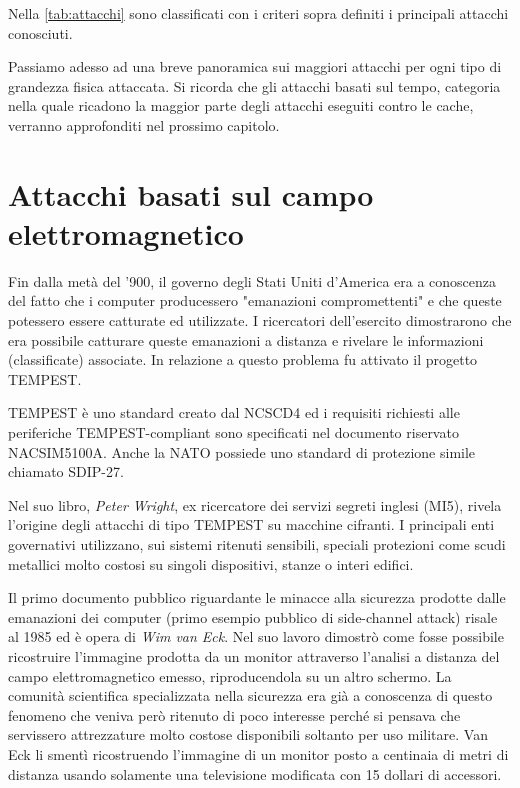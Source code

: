 			Nella \cref{tab:attacchi} sono classificati con i criteri sopra definiti i principali attacchi conosciuti.
			
			Passiamo adesso ad una breve panoramica sui maggiori attacchi per ogni tipo di grandezza fisica attaccata. Si ricorda che gli attacchi basati sul tempo, categoria nella quale ricadono la maggior parte degli attacchi eseguiti contro le cache, verranno approfonditi nel prossimo capitolo.
			
	\section{Attacchi basati sul campo elettromagnetico}
		Fin dalla metà del '900, il governo degli Stati Uniti d'America era a conoscenza del fatto che i computer producessero "emanazioni compromettenti" e che queste potessero essere catturate ed utilizzate. I ricercatori dell'esercito dimostrarono che era possibile catturare queste emanazioni a distanza e rivelare le informazioni (classificate) associate. In relazione a questo problema fu attivato il progetto \ac{TEMPEST}.
		
		TEMPEST è uno standard creato dal \ac{NCSCD4} ed i requisiti richiesti alle periferiche TEMPEST-compliant sono specificati nel documento riservato NACSIM5100A. Anche la \ac{NATO} possiede uno standard di protezione simile chiamato SDIP-27.
		
		Nel suo libro\cite{wright1987spycatcher}, \emph{Peter Wright}, ex ricercatore dei servizi segreti inglesi (MI5), rivela l'origine degli attacchi di tipo TEMPEST su macchine cifranti. I principali enti governativi utilizzano, sui sistemi ritenuti sensibili, speciali protezioni come scudi metallici molto costosi su singoli dispositivi, stanze o interi edifici\cite{herndon1990electromagnetic}.
		
		Il primo documento pubblico riguardante le minacce alla sicurezza prodotte dalle emanazioni dei computer (primo esempio pubblico di side-channel attack) risale al 1985 ed è opera di \emph{Wim van Eck}\cite{van1985electromagn}. Nel suo lavoro dimostrò come fosse possibile ricostruire l'immagine prodotta da un monitor attraverso l'analisi a distanza del campo elettromagnetico emesso, riproducendola su un altro schermo. La comunità scientifica specializzata nella sicurezza era già a conoscenza di questo fenomeno che veniva però ritenuto di poco interesse perché si pensava che servissero attrezzature molto costose disponibili soltanto per uso militare. Van Eck li smentì ricostruendo l'immagine di un monitor posto a centinaia di metri di distanza usando solamente una televisione modificata con 15 dollari di accessori.
		
